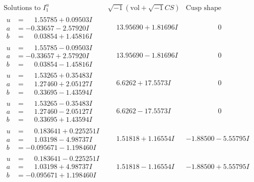 \documentclass[1p]{elsarticle_modified}
\theoremstyle{definition}
\newcommand{\I}{\sqrt{-1}}
\begin{document}
$$\begin{array}{c|c|c}
 \end{array}$$\newpage$$\begin{array}{c|c|c}  
\text{Solutions to }I^u_{1}& \I (\text{vol} + \sqrt{-1}CS) & \text{Cusp shape}\\
 \hline 
\begin{aligned}
u &= \phantom{-}1.55785 + 0.09503 I \\
a &= -0.33657 - 2.57920 I \\
b &= \phantom{-}0.03854 + 1.45816 I\end{aligned}
 & \phantom{-}13.95690 + 1.81696 I & \phantom{-0.000000 } 0 \\ \hline\begin{aligned}
u &= \phantom{-}1.55785 - 0.09503 I \\
a &= -0.33657 + 2.57920 I \\
b &= \phantom{-}0.03854 - 1.45816 I\end{aligned}
 & \phantom{-}13.95690 - 1.81696 I & \phantom{-0.000000 } 0 \\ \hline\begin{aligned}
u &= \phantom{-}1.53265 + 0.35483 I \\
a &= \phantom{-}1.27460 + 2.05127 I \\
b &= \phantom{-}0.33695 - 1.43594 I\end{aligned}
 & \phantom{-}6.6262 + 17.5573 I & \phantom{-0.000000 } 0 \\ \hline\begin{aligned}
u &= \phantom{-}1.53265 - 0.35483 I \\
a &= \phantom{-}1.27460 - 2.05127 I \\
b &= \phantom{-}0.33695 + 1.43594 I\end{aligned}
 & \phantom{-}6.6262 - 17.5573 I & \phantom{-0.000000 } 0 \\ \hline\begin{aligned}
u &= \phantom{-}0.183641 + 0.225251 I \\
a &= \phantom{-}1.03198 - 4.98737 I \\
b &= -0.095671 - 1.198460 I\end{aligned}
 & \phantom{-}1.51818 + 1.16554 I & -1.88500 - 5.55795 I \\ \hline\begin{aligned}
u &= \phantom{-}0.183641 - 0.225251 I \\
a &= \phantom{-}1.03198 + 4.98737 I \\
b &= -0.095671 + 1.198460 I\end{aligned}
 & \phantom{-}1.51818 - 1.16554 I & -1.88500 + 5.55795 I \\ \hline\begin{aligned}

\end{aligned}
\end{array}$$
\end{document}
